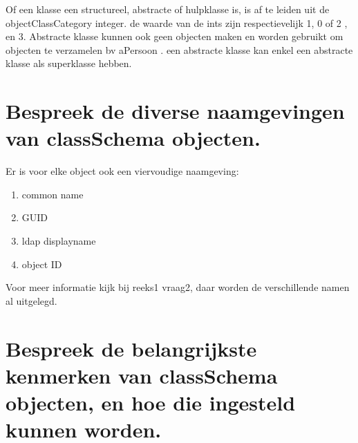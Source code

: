 Of een klasse een structureel, abstracte of hulpklasse is, is af te leiden uit de objectClassCategory integer.
de waarde van de ints zijn respectievelijk 1, 0 of 2 , en 3. Abstracte klasse kunnen ook geen objecten maken en worden gebruikt om objecten te verzamelen bv aPersoon . een abstracte klasse kan enkel een abstracte klasse als superklasse hebben.

\clearpage

\section{Bespreek de diverse naamgevingen van classSchema objecten.}

Er is voor elke object ook een viervoudige naamgeving:
\begin{enumerate}
\item common name
\item GUID
\item ldap displayname
\item object ID
\end{enumerate}
Voor meer informatie kijk bij reeks1 vraag2, daar worden de verschillende namen al uitgelegd.

\section{Bespreek de belangrijkste kenmerken van classSchema objecten, en hoe die ingesteld kunnen worden.}

